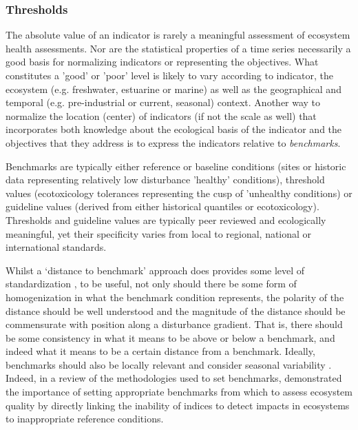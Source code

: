\subsubsection{Thresholds}\label{sec:benchmarks}

The absolute value of an indicator is rarely a meaningful assessment of ecosystem health
assessments.  Nor are the statistical properties of a time series necessarily a good basis for
normalizing indicators or representing the objectives.  What constitutes a 'good' or 'poor' level is
likely to vary according to indicator, the ecosystem (e.g. freshwater, estuarine or marine) as well
as the geographical and temporal (e.g. pre-industrial or current, seasonal) context.  Another way to
normalize the location (center) of indicators (if not the scale as well) that incorporates both
knowledge about the ecological basis of the indicator and the objectives that they address is to
express the indicators relative to \textit{benchmarks}.

Benchmarks are typically either reference or baseline conditions (sites or historic data
representing relatively low disturbance 'healthy' conditions), threshold values (ecotoxicology
tolerances representing the cusp of 'unhealthy conditions) or guideline values (derived from either
historical quantiles or ecotoxicology).  Thresholds and guideline values are typically peer reviewed
and ecologically meaningful, yet their specificity varies from local to regional, national or
international standards.
 
Whilst a `distance to benchmark' approach does provides some level of standardization
\citep{Connolly-2013}, to be useful, not only should there be some form of homogenization in what
the benchmark condition represents, the polarity of the distance should be well understood
\citep{Hijuelos-2013} and the magnitude of the distance should be commensurate with position along a
disturbance gradient.  That is, there should be some consistency in what it means to be above or
below a benchmark, and indeed what it means to be a certain distance from a benchmark.  Ideally,
benchmarks should also be locally relevant \citep{Connolly-2013} and consider seasonal variability
\citep{Coates-2007, Hallett-2012}.  Indeed, in a review of the methodologies used to set benchmarks,
\citep{Borja-2012} demonstrated the importance of setting appropriate benchmarks from which to
assess ecosystem quality by directly linking the inability of indices to detect impacts in
ecosystems to inappropriate reference conditions.

